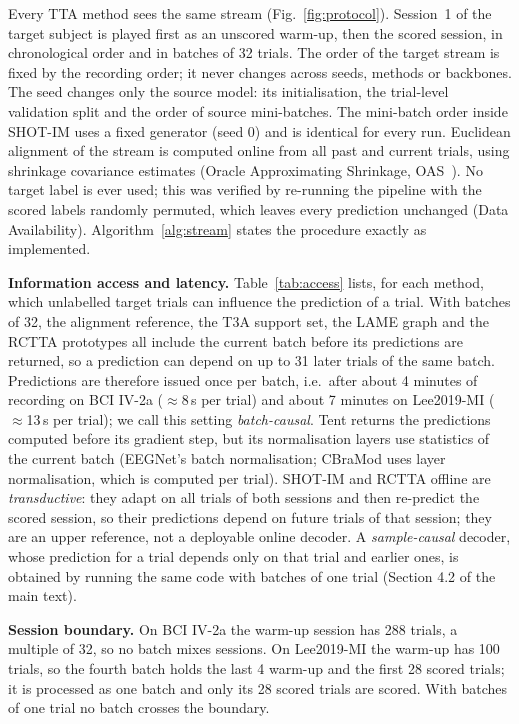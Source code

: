 \documentclass[preprint,12pt]{elsarticle}
\newcommand{\rev}[1]{#1}
\begin{document}
Every TTA method sees the same stream (Fig.~\ref{fig:protocol}). Session~1 of the target subject is played first as an unscored warm-up, then the scored session, in chronological order and in batches of 32 trials. \rev{The order of the target stream is fixed by the recording order; it never changes across seeds, methods or backbones. The seed changes only the source model: its initialisation, the trial-level validation split and the order of source mini-batches. The mini-batch order inside SHOT-IM uses a fixed generator (seed 0) and is identical for every run.} Euclidean alignment of the stream is computed online from all past and current trials, using shrinkage covariance estimates (Oracle Approximating Shrinkage, OAS~\cite{chen2010oas}). No target label is ever used\rev{; this was verified by re-running the pipeline with the scored labels randomly permuted, which leaves every prediction unchanged (Data Availability)}. Algorithm~\ref{alg:stream} states the procedure exactly as implemented.

\rev{\textbf{Information access and latency.} Table~\ref{tab:access} lists, for each method, which unlabelled target trials can influence the prediction of a trial. With batches of 32, the alignment reference, the T3A support set, the LAME graph and the RCTTA prototypes all include the current batch before its predictions are returned, so a prediction can depend on up to 31 later trials of the same batch. Predictions are therefore issued once per batch, i.e.\ after about 4 minutes of recording on BCI IV-2a ($\approx$8\,s per trial) and about 7 minutes on Lee2019-MI ($\approx$13\,s per trial); we call this setting \emph{batch-causal}. Tent returns the predictions computed before its gradient step, but its normalisation layers use statistics of the current batch (EEGNet's batch normalisation; CBraMod uses layer normalisation, which is computed per trial). SHOT-IM and RCTTA offline are \emph{transductive}: they adapt on all trials of both sessions and then re-predict the scored session, so their predictions depend on future trials of that session; they are an upper reference, not a deployable online decoder. A \emph{sample-causal} decoder, whose prediction for a trial depends only on that trial and earlier ones, is obtained by running the same code with batches of one trial (Section 4.2 of the main text).}

\rev{\textbf{Session boundary.} On BCI IV-2a the warm-up session has 288 trials, a multiple of 32, so no batch mixes sessions. On Lee2019-MI the warm-up has 100 trials, so the fourth batch holds the last 4 warm-up and the first 28 scored trials; it is processed as one batch and only its 28 scored trials are scored. With batches of one trial no batch crosses the boundary.}
\end{document}
